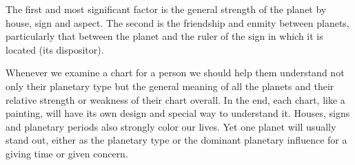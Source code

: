  

The first and most significant factor is the general strength of the planet by house, sign and aspect.
The second is the friendship and enmity between planets, particularly that between the planet and the ruler of the sign in which it is located (its dispositor).
 

Whenever we examine a chart for a person we should help them understand not only their planetary type but the general meaning of all the planets and their relative strength or weakness of their chart overall. In the end, each chart, like a painting, will have its own design and special way to understand it. Houses, signs and planetary periods also strongly color our lives. Yet one planet will usually stand out, either as the planetary type or the dominant planetary influence for a giving time or given concern.